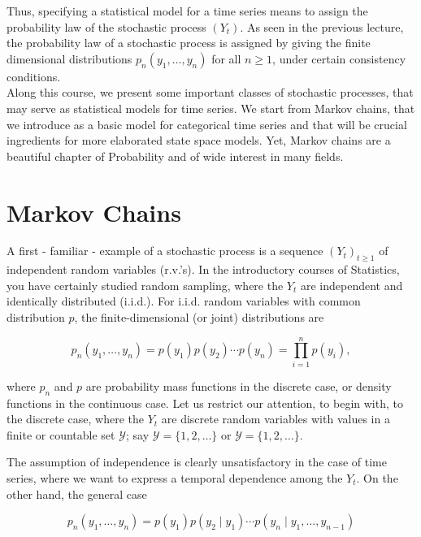 \documentclass[dvipsnames,12pt]{book}
\begin{document}
            Thus, specifying a statistical model for a time series means to assign the probability law of the stochastic process \((Y_t)\). As seen in the previous lecture, the probability law of a stochastic process is assigned by giving the finite dimensional distributions \(p_n(y_1,\ldots,y_n)\) for all \(n \geq 1\), under certain consistency conditions. \\

            Along this course, we present some important classes of stochastic processes, that may serve as statistical models for time series. We start from Markov chains, that we introduce as a basic model for categorical time series and that will be crucial ingredients for more elaborated state space models. Yet, Markov chains are a beautiful chapter of Probability and of wide interest in many fields.

\newpage
        \section{Markov Chains}

            A first - familiar - example of a stochastic process is a sequence \((Y_t)_{t \geq 1}\) of independent random variables (r.v.’s). In the introductory courses of Statistics, you have certainly studied random sampling, where the \( Y_t \) are independent and identically distributed (i.i.d.). For i.i.d. random variables with common distribution \( p \), the finite-dimensional (or joint) distributions are

            \begin{equation}
                p_n(y_1, \dots, y_n) = p(y_1) p(y_2) \cdots p(y_n) = \prod_{i=1}^{n} p(y_i),
            \end{equation}

            where \( p_n \) and \( p \) are probability mass functions in the discrete case, or density functions in the continuous case. Let us restrict our attention, to begin with, to the discrete case, where the \( Y_t \) are discrete random variables with values in a finite or countable set \( \mathcal{Y} \); say \( \mathcal{Y} = \{1, 2, \dots\} \) or \( \mathcal{Y} = \{1, 2, \dots\} \).

            The assumption of independence is clearly unsatisfactory in the case of time series, where we want to express a temporal dependence among the \( Y_t \). On the other hand, the general case

            \begin{equation}
                p_n(y_1, \dots, y_n) = p(y_1) p(y_2 \mid y_1) \cdots p(y_n \mid y_1, \dots, y_{n-1})
            \end{equation}
\end{document}
